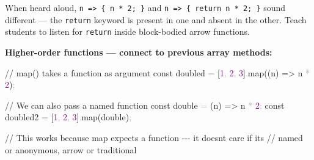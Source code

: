 \documentclass[
  justified,
  openright,
]{tufte-book}
\newcommand{\CommentTok}[1]{\textcolor{MidGray}{#1}}
\newcommand{\ControlFlowTok}[1]{\textcolor{BrandBlue}{#1}}
\newcommand{\DecValTok}[1]{\textcolor{Purple}{#1}}
\newcommand{\FunctionTok}[1]{\textcolor{BrandBlue}{#1}}
\newcommand{\KeywordTok}[1]{\textcolor{BrandBlue}{#1}}
\newcommand{\NormalTok}[1]{#1}
\newcommand{\OperatorTok}[1]{\textcolor{DarkGray}{#1}}
\newcommand{\SpecialCharTok}[1]{\textcolor{Teal}{#1}}
\newcommand{\VerbatimStringTok}[1]{\textcolor{Teal}{#1}}
\newenvironment{Shaded}{%
  \begin{snugshade}
}{%
  \end{snugshade}
}
\begin{document}
\begin{Shaded}
\end{Shaded}

When heard aloud, \texttt{n\ =\textgreater{}\ \{\ n\ *\ 2;\ \}} and
\texttt{n\ =\textgreater{}\ \{\ return\ n\ *\ 2;\ \}} sound different
--- the \texttt{return} keyword is present in one and absent in the
other. Teach students to listen for \texttt{return} inside block-bodied
arrow functions.

\textbf{Higher-order functions --- connect to previous array methods:}

\begin{Shaded}
\begin{Highlighting}[]
\CommentTok{// map() takes a function as argument}
\KeywordTok{const}\NormalTok{ doubled }\OperatorTok{=}\NormalTok{ [}\DecValTok{1}\OperatorTok{,} \DecValTok{2}\OperatorTok{,} \DecValTok{3}\NormalTok{]}\OperatorTok{.}\FunctionTok{map}\NormalTok{((n) }\KeywordTok{=\textgreater{}}\NormalTok{ n }\OperatorTok{*} \DecValTok{2}\NormalTok{)}\OperatorTok{;}

\CommentTok{// We can also pass a named function}
\KeywordTok{const}\NormalTok{ double }\OperatorTok{=}\NormalTok{ (n) }\KeywordTok{=\textgreater{}}\NormalTok{ n }\OperatorTok{*} \DecValTok{2}\OperatorTok{;}
\KeywordTok{const}\NormalTok{ doubled2 }\OperatorTok{=}\NormalTok{ [}\DecValTok{1}\OperatorTok{,} \DecValTok{2}\OperatorTok{,} \DecValTok{3}\NormalTok{]}\OperatorTok{.}\FunctionTok{map}\NormalTok{(double)}\OperatorTok{;}

\CommentTok{// This works because map expects a function {-}{-}{-} it doesn\textquotesingle{}t care if it\textquotesingle{}s}
\CommentTok{// named or anonymous, arrow or traditional}
\end{Highlighting}
\end{Shaded}
\end{document}
